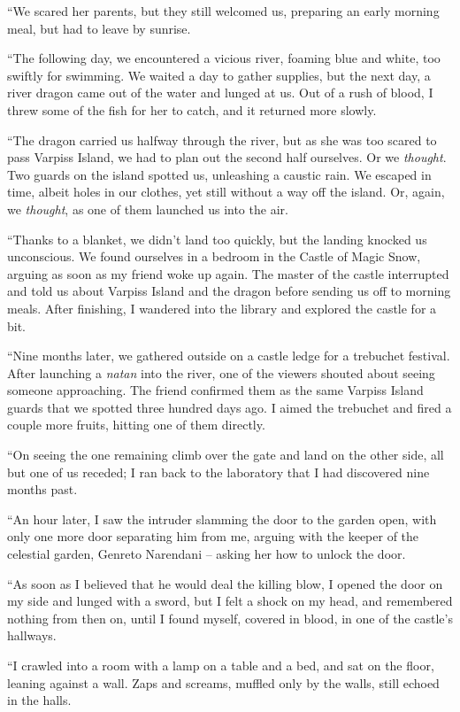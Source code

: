 ``We scared her parents, but they still welcomed us, preparing an early morning meal, but had to leave by sunrise.

``The following day, we encountered a vicious river, foaming blue and white, too swiftly for swimming. We waited a day to gather supplies, but the next day, a river dragon came out of the water and lunged at us. Out of a rush of blood, I threw some of the fish for her to catch, and it returned more slowly.

``The dragon carried us halfway through the river, but as she was too scared to pass Varpiss Island, we had to plan out the second half ourselves. Or we \emph{thought}. Two guards on the island spotted us, unleashing a caustic rain. We escaped in time, albeit holes in our clothes, yet still without a way off the island. Or, again, we \emph{thought}, as one of them launched us into the air.

``Thanks to a blanket, we didn't land too quickly, but the landing knocked us unconscious. We found ourselves in a bedroom in the Castle of Magic Snow, arguing as soon as my friend woke up again. The master of the castle interrupted and told us about Varpiss Island and the dragon before sending us off to morning meals. After finishing, I wandered into the library and explored the castle for a bit.

``Nine months later, we gathered outside on a castle ledge for a trebuchet festival. After launching a \emph{natan} into the river, one of the viewers shouted about seeing someone approaching. The friend confirmed them as the same Varpiss Island guards that we spotted three hundred days ago. I aimed the trebuchet and fired a couple more fruits, hitting one of them directly.

``On seeing the one remaining climb over the gate and land on the other side, all but one of us receded; I ran back to the laboratory that I had discovered nine months past.

``An hour later, I saw the intruder slamming the door to the garden open, with only one more door separating him from me, arguing with the keeper of the celestial garden, Genreto Narendani -- asking her how to unlock the door.

``As soon as I believed that he would deal the killing blow, I opened the door on my side and lunged with a sword, but I felt a shock on my head, and remembered nothing from then on, until I found myself, covered in blood, in one of the castle's hallways.

``I crawled into a room with a lamp on a table and a bed, and sat on the floor, leaning against a wall. Zaps and screams, muffled only by the walls, still echoed in the halls.


